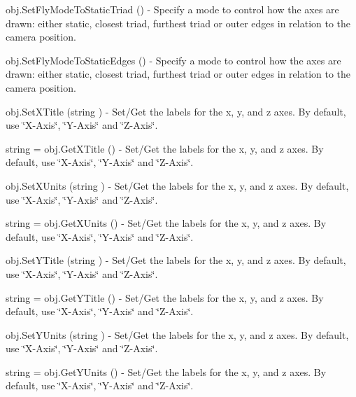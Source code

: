 \begin{DoxyItemize}
\item {\ttfamily obj.\-Set\-Fly\-Mode\-To\-Static\-Triad ()} -\/ Specify a mode to control how the axes are drawn\-: either static, closest triad, furthest triad or outer edges in relation to the camera position.  
\item {\ttfamily obj.\-Set\-Fly\-Mode\-To\-Static\-Edges ()} -\/ Specify a mode to control how the axes are drawn\-: either static, closest triad, furthest triad or outer edges in relation to the camera position.  
\item {\ttfamily obj.\-Set\-X\-Title (string )} -\/ Set/\-Get the labels for the x, y, and z axes. By default, use \char`\"{}\-X-\/\-Axis\char`\"{}, \char`\"{}\-Y-\/\-Axis\char`\"{} and \char`\"{}\-Z-\/\-Axis\char`\"{}.  
\item {\ttfamily string = obj.\-Get\-X\-Title ()} -\/ Set/\-Get the labels for the x, y, and z axes. By default, use \char`\"{}\-X-\/\-Axis\char`\"{}, \char`\"{}\-Y-\/\-Axis\char`\"{} and \char`\"{}\-Z-\/\-Axis\char`\"{}.  
\item {\ttfamily obj.\-Set\-X\-Units (string )} -\/ Set/\-Get the labels for the x, y, and z axes. By default, use \char`\"{}\-X-\/\-Axis\char`\"{}, \char`\"{}\-Y-\/\-Axis\char`\"{} and \char`\"{}\-Z-\/\-Axis\char`\"{}.  
\item {\ttfamily string = obj.\-Get\-X\-Units ()} -\/ Set/\-Get the labels for the x, y, and z axes. By default, use \char`\"{}\-X-\/\-Axis\char`\"{}, \char`\"{}\-Y-\/\-Axis\char`\"{} and \char`\"{}\-Z-\/\-Axis\char`\"{}.  
\item {\ttfamily obj.\-Set\-Y\-Title (string )} -\/ Set/\-Get the labels for the x, y, and z axes. By default, use \char`\"{}\-X-\/\-Axis\char`\"{}, \char`\"{}\-Y-\/\-Axis\char`\"{} and \char`\"{}\-Z-\/\-Axis\char`\"{}.  
\item {\ttfamily string = obj.\-Get\-Y\-Title ()} -\/ Set/\-Get the labels for the x, y, and z axes. By default, use \char`\"{}\-X-\/\-Axis\char`\"{}, \char`\"{}\-Y-\/\-Axis\char`\"{} and \char`\"{}\-Z-\/\-Axis\char`\"{}.  
\item {\ttfamily obj.\-Set\-Y\-Units (string )} -\/ Set/\-Get the labels for the x, y, and z axes. By default, use \char`\"{}\-X-\/\-Axis\char`\"{}, \char`\"{}\-Y-\/\-Axis\char`\"{} and \char`\"{}\-Z-\/\-Axis\char`\"{}.  
\item {\ttfamily string = obj.\-Get\-Y\-Units ()} -\/ Set/\-Get the labels for the x, y, and z axes. By default, use \char`\"{}\-X-\/\-Axis\char`\"{}, \char`\"{}\-Y-\/\-Axis\char`\"{} and \char`\"{}\-Z-\/\-Axis\char`\"{}.  

\end{DoxyItemize}
